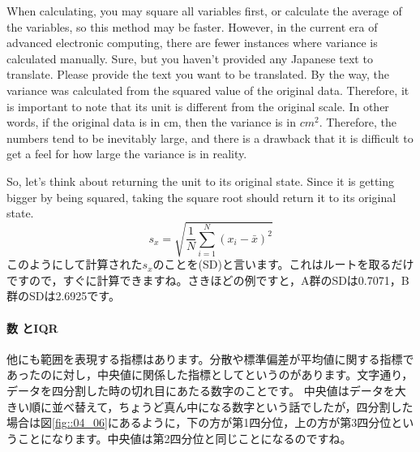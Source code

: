 \documentclass{ltjbook}
\begin{document}
When calculating, you may square all variables first, or calculate the average of the variables, so this method may be faster. However, in the current era of advanced electronic computing, there are fewer instances where variance is calculated manually.
Sure, but you haven't provided any Japanese text to translate. Please provide the text you want to be translated.
By the way, the variance was calculated from the squared value of the original data. Therefore, it is important to note that its unit is different from the original scale. In other words, if the original data is in cm, then the variance is in $cm^2$. Therefore, the numbers tend to be inevitably large, and there is a drawback that it is difficult to get a feel for how large the variance is in reality.

So, let's think about returning the unit to its original state. Since it is getting bigger by being squared, taking the square root should return it to its original state.
\[ s_x = \sqrt{\frac{1}{N}\sum_{i=1}^N (x_i - \bar{x})^2} \]
このようにして計算された$s_x$のことを(SD)と言います。これはルートを取るだけですので，すぐに計算できますね。さきほどの例ですと，A群のSDは0.7071，B群のSDは2.6925です。


\paragraph{数 とIQR}
他にも範囲を表現する指標はあります。分散や標準偏差が平均値に関する指標であったのに対し，中央値に関係した指標としてというのがあります。文字通り，データを四分割した時の切れ目にあたる数字のことです。
中央値はデータを大きい順に並べ替えて，ちょうど真ん中になる数字という話でしたが，四分割した場合は図\ref{fig::04_06}にあるように，下の方が第1四分位，上の方が第3四分位ということになります。中央値は第2四分位と同じことになるのですね。
\end{document}
